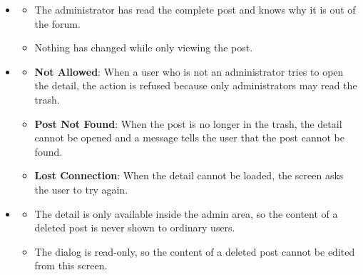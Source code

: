 \begin{itemize}[leftmargin=1.6em,topsep=4pt,itemsep=3pt,parsep=0pt,label=$\bullet$]
\begin{itemize}[leftmargin=2.2em,topsep=2pt,itemsep=3pt,parsep=0pt,label=$\circ$]
            \item \textbf{No Score}: When the automatic check produced no score, the badge shows ``N/A'' and the rest of the dialog is unchanged.
            \item \textbf{Rejected Post}: When the post was rejected during moderation, the dialog shows the Rejected badge and the line ``In trash (rejected)''.
        \end{itemize}
    \item {}
        \begin{itemize}[leftmargin=2.2em,topsep=2pt,itemsep=3pt,parsep=0pt,label=$\circ$]
            \item The administrator has read the complete post and knows why it is out of the forum.
            \item Nothing has changed while only viewing the post.
        \end{itemize}
    \item {}
        \begin{itemize}[leftmargin=2.2em,topsep=2pt,itemsep=3pt,parsep=0pt,label=$\circ$]
            \item \textbf{Not Allowed}: When a user who is not an administrator tries to open the detail, the action is refused because only administrators may read the trash.
            \item \textbf{Post Not Found}: When the post is no longer in the trash, the detail cannot be opened and a message tells the user that the post cannot be found.
            \item \textbf{Lost Connection}: When the detail cannot be loaded, the screen asks the user to try again.
        \end{itemize}
    \item {}
        \begin{itemize}[leftmargin=2.2em,topsep=2pt,itemsep=3pt,parsep=0pt,label=$\circ$]
            \item The detail is only available inside the admin area, so the content of a deleted post is never shown to ordinary users.
            \item The dialog is read-only, so the content of a deleted post cannot be edited from this screen.
        \end{itemize}
\end{itemize}


